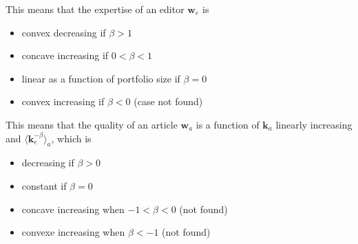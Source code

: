 This means that the expertise of an editor $\mathbf{w}_e$ is 

\begin{itemize}
  \item convex decreasing if $\beta > 1$
  \item concave increasing if $0 < \beta < 1$
  \item linear as a function of portfolio size if $\beta =0$
  \item convex increasing if $\beta < 0$ (case not found)
\end{itemize}


This means that the quality of an article  $\mathbf{w}_a$ is a function of $\mathbf{k}_a$ linearly increasing and  $\langle\mathbf{k}_e^{-\beta}\rangle_a$, which is 

\begin{itemize}
  \item decreasing if $\beta > 0$ 
  \item constant if $\beta = 0$
  \item concave increasing when $ -1 < \beta < 0$ (not found)
  \item convexe increasing when $ \beta < -1 $ (not found)
\end{itemize}




